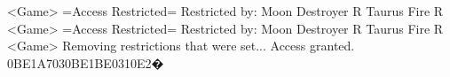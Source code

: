 <Game> =Access Restricted= 
Restricted by: Moon Destroyer R Taurus Fire R 
<Game> =Access Restricted= 
Restricted by: Moon Destroyer R Taurus Fire R 
<Game> Removing restrictions that were set... Access granted. 
{0B}{E1}{A7}{03}{0B}{E1}{BE}{03}{10}{E2}�
